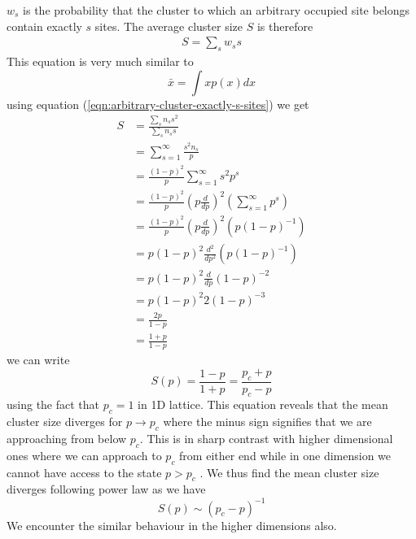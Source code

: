		$w_s$ is the probability that the cluster to which an arbitrary occupied site belongs contain exactly $s$ sites. The average cluster size $S$ is therefore
		\begin{eqnarray}
			S = \sum_{s} w_s s
		\end{eqnarray}
		This equation is very much similar to
		\begin{equation}
			\bar{x} = \int x p(x) dx
		\end{equation}
		using equation (\ref{eqn:arbitrary-cluster-exactly-s-sites}) we get
		\begin{align}
			S 
			&= \frac{\sum_{s} n_s s^2}{\sum_{s} n_s s} \nonumber \\
			&= \sum_{s=1}^{\infty} \frac{s^2 n_s}{p} \nonumber\\
			&= \frac{(1-p)^2}{p} \sum_{s=1}^{\infty} s^2 p^s \nonumber \\
			&= \frac{(1-p)^2}{p} \left(p \frac{d}{dp}\right)^2 \left(\sum_{s=1}^{\infty} p^s\right) \nonumber \\
			&= \frac{(1-p)^2}{p} \left(p \frac{d}{dp}\right)^2 (p(1-p)^{-1}) \nonumber \\
			&= p(1-p)^2 \frac{d^2}{dp^2} (p(1-p)^{-1}) \nonumber \\
			&= p(1-p)^2 \frac{d}{dp}(1-p)^{-2} \nonumber \\
			&= p(1-p)^2 2 (1-p)^{-3} \nonumber \\
			&= \frac{2p}{1-p} \nonumber \\
			&= \frac{1 + p}{1 - p}
		\end{align}
		we can write
		\begin{equation}
			S(p) = \frac{1-p}{1 + p} = \frac{p_c + p}{p_c - p}
		\end{equation}
		using the fact that $p_c = 1$ in 1D lattice.
		This equation reveals that the mean cluster size diverges for $p\rightarrow p_c$ where the minus	sign signifies that we are approaching from below $p_c$. This is in sharp contrast with	higher dimensional ones where we can approach to $p_c$ from either end while in one	dimension we cannot have access to the state $p > p_c$ . We thus find the mean cluster	size diverges following power law as we have \cite{nesm-lecture-notes}
		\begin{equation}
			S(p) \sim (p_c - p)^{-1}
		\end{equation}
		We encounter the similar behaviour in the higher dimensions also.
		
